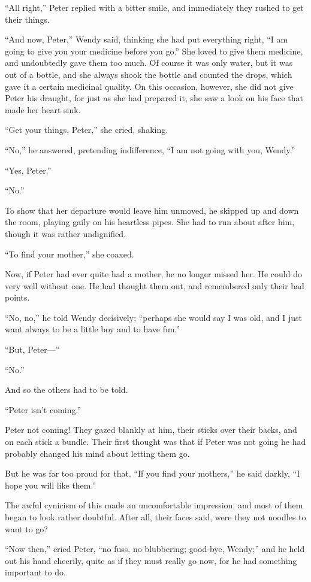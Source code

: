 ``All right,'' Peter replied with a bitter smile, and immediately they
rushed to get their things.

``And now, Peter,'' Wendy said, thinking she had put everything right, ``I
am going to give you your medicine before you go.'' She loved to give
them medicine, and undoubtedly gave them too much. Of course it was
only water, but it was out of a bottle, and she always shook the bottle
and counted the drops, which gave it a certain medicinal quality. On
this occasion, however, she did not give Peter his draught, for just as
she had prepared it, she saw a look on his face that made her heart
sink.

``Get your things, Peter,'' she cried, shaking.

``No,'' he answered, pretending indifference, ``I am not going with you,
Wendy.''

``Yes, Peter.''

``No.''

To show that her departure would leave him unmoved, he skipped up and
down the room, playing gaily on his heartless pipes. She had to run
about after him, though it was rather undignified.

``To find your mother,'' she coaxed.

Now, if Peter had ever quite had a mother, he no longer missed her. He
could do very well without one. He had thought them out, and remembered
only their bad points.

``No, no,'' he told Wendy decisively; ``perhaps she would say I was old,
and I just want always to be a little boy and to have fun.''

``But, Peter—''

``No.''

And so the others had to be told.

``Peter isn't coming.''

Peter not coming! They gazed blankly at him, their sticks over their
backs, and on each stick a bundle. Their first thought was that if
Peter was not going he had probably changed his mind about letting them
go.

But he was far too proud for that. ``If you find your mothers,'' he said
darkly, ``I hope you will like them.''

The awful cynicism of this made an uncomfortable impression, and most
of them began to look rather doubtful. After all, their faces said,
were they not noodles to want to go?

``Now then,'' cried Peter, ``no fuss, no blubbering; good-bye, Wendy;'' and
he held out his hand cheerily, quite as if they must really go now, for
he had something important to do.

